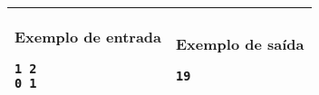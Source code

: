 \begin{table}[!h]
\centering
\begin{tabular}{|l|l|}
\hline
\begin{minipage}[t]{3in}
\textbf{Exemplo de entrada}
\begin{verbatim}
1 2
0 1
\end{verbatim}
\vspace{1mm}
\end{minipage}
&

\begin{minipage}[t]{3in}
\textbf{Exemplo de saída}
\begin{verbatim}
19
\end{verbatim}
\vspace{1mm}
\end{minipage} \\
\hline
\end{tabular}
\end{table}

